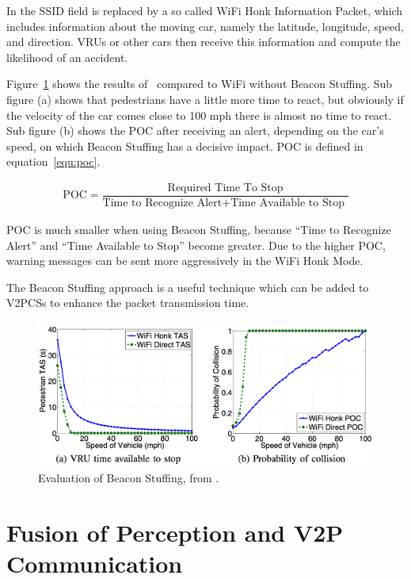 \documentclass[]{ccs-thesis}
\begin{document}
In \cite{beacon} the SSID field is replaced by a so called WiFi Honk Information Packet, which includes information about the moving car, namely the latitude, longitude, speed, and direction. \acp{VRU} or other cars then receive this information and compute the likelihood of an accident.

Figure~\ref{fig:beacon} shows the results of~\cite{beacon} compared to WiFi without Beacon Stuffing. Sub figure (a) shows that pedestrians have a little more time to react, but obviously if the velocity of the car comes close to 100 mph there is almost no time to react. Sub figure (b) shows the \ac{POC} after receiving an alert, depending on the car's speed, on which Beacon Stuffing has a decisive impact. \ac{POC} is defined in equation~\ref{equ:poc}.

\begin{align}\label{equ:poc}
\text{POC}=\dfrac{\text{Required Time To Stop}}{\text{Time to Recognize Alert}+\text{Time Available to Stop }}
\end{align}

POC is much smaller when using Beacon Stuffing, because \enquote{Time to Recognize Alert} and \enquote{Time Available to Stop} become greater. Due to the higher \ac{POC}, warning messages can be sent more aggressively in the WiFi Honk Mode.

The Beacon Stuffing approach is a useful technique which can be added to \acp{V2PCS} to enhance the packet transmission time.

\begin{figure}[h]
	\centering
	\includegraphics[width=1\textwidth]{figures/6_beacon}
	\caption{Evaluation of Beacon Stuffing, from \cite{beacon}.}%
	\label{fig:beacon}%
\end{figure}

\section{Fusion of Perception and V2P Communication}\label{sec:fusion}
\end{document}
